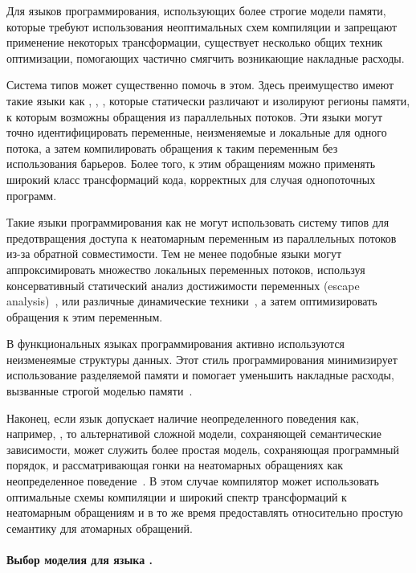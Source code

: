 Для языков программирования, использующих более строгие модели памяти, 
которые требуют использования неоптимальных схем компиляции 
и запрещают применение некоторых трансформации, 
существует несколько общих техник оптимизации, 
помогающих частично смягчить возникающие накладные расходы. 

Система типов может существенно помочь в этом. 
Здесь преимущество имеют такие языки как \Haskell, \OCaml, \Rust, 
которые статически различают и изолируют регионы памяти, 
к которым возможны обращения из параллельных потоков. 
Эти языки могут точно идентифицировать переменные, неизменяемые и локальные для одного потока, 
а затем компилировать обращения к таким переменным без использования барьеров. 
Более того, к этим обращениям можно применять широкий класс трансформаций кода, 
корректных для случая однопоточных программ.
 
Такие языки программирования как  \Java не могут
использовать систему типов для предотвращения 
доступа к неатомарным переменным из параллельных потоков
из-за обратной совместимости.
Тем не менее подобные языки
могут аппроксимировать множество локальных переменных потоков,  используя консервативный 
статический анализ достижимости переменных 
(escape analysis)~\cite{Choi-al:OOPSLA1999}, 
или различные динамические техники~\cite{Liu-al:PLDI19},
а затем оптимизировать обращения к этим переменным.  

В функциональных языках программирования активно используются  неизменеямые структуры данных. 
Этот стиль программирования минимизирует 
использование разделяемой памяти и помогает 
уменьшить накладные расходы, вызванные 
строгой моделью памяти~\cite{Vollmer-al:PPoPP17}.  

Наконец, если язык допускает наличие неопределенного поведения как, например, \CPP, то альтернативой сложной модели, 
сохраняющей семантические зависимости, 
может служить более простая модель, сохраняющая программный порядок, 
и рассматривающая гонки на неатомарных обращениях как 
неопределенное поведение~\cite{Boehm-Demsky:MSPC14, Ou-Demsky:OOPSLA18}.
В этом случае компилятор может использовать оптимальные 
схемы компиляции и широкий спектр трансформаций к неатомарным обращениям
и в то же время предоставлять относительно простую семантику для атомарных обращений. 

\paragraph{Выбор моделия для языка \Kotlin.}

